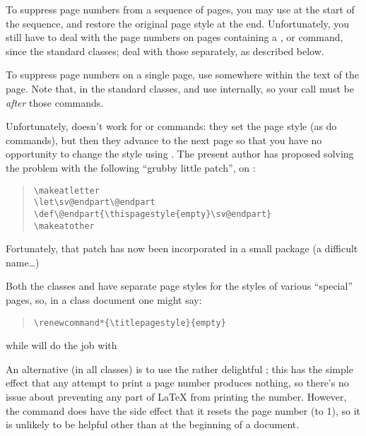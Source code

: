 To suppress page numbers from a sequence of pages, you may use
 at the start of the sequence, and restore
the original page style at the end.  Unfortunately, you still have to
deal with the page numbers on pages containing a ,
 or  command, since the standard classes; deal
with those separately, as described below.

To suppress page numbers on a single page, use
 somewhere within the text of the
page.  Note that, in the standard classes,  and
 use  internally, so your call
must be \emph{after} those commands.

Unfortunately,  doesn't work for  or
  commands: they set the page style (as do
 commands), but then they advance to the next page so
that you have no opportunity to change the style using
.  The present author has proposed solving the
problem with the following ``grubby little patch'', on
:
\begin{quote}
\begin{verbatim}
\makeatletter
\let\sv@endpart\@endpart
\def\@endpart{\thispagestyle{empty}\sv@endpart}
\makeatother
\end{verbatim}
\end{quote}
Fortunately, that patch has now been incorporated in a small package
 (a difficult name\dots)

Both the  classes and  have separate
page styles for the styles of various ``special'' pages, so, in a
 class document one might say:
\begin{quote}
\begin{verbatim}
\renewcommand*{\titlepagestyle}{empty}
\end{verbatim}
\end{quote}
while  will do the job with
\begin{quote}
\end{quote}

An alternative (in all classes) is to use the rather delightful
; this has the simple effect that any
attempt to print a page number produces nothing, so there's no issue
about preventing any part of \LaTeX{} from printing the number.
However, the  command does have the side effect that
it resets the page number (to 1), so it is unlikely to be helpful
other than at the beginning of a document.

